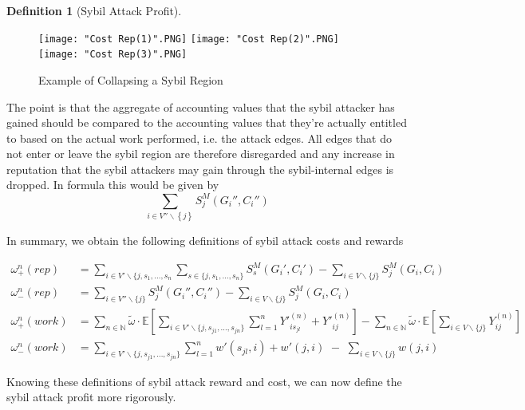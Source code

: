 \documentclass[11pt,a4paper]{article}
\theoremstyle{definition}
\newtheorem{definition}{Definition}[section]
\theoremstyle{theorem}
\theoremstyle{proposition}
\theoremstyle{corollary}
\theoremstyle{lemma}
\theoremstyle{example}
\theoremstyle{remark}
\begin{document}
\begin{definition}[Sybil Attack Profit]
\begin{figure}[H]
\begin{center}
\texttt{[image: "Cost Rep(1)".PNG]} 
\texttt{[image: "Cost Rep(2)".PNG]} 
\texttt{[image: "Cost Rep(3)".PNG]}
\caption{Example of Collapsing a Sybil Region}
\label{fig:Example of Collapsing a Sybil Region}
\end{center}
\end{figure}

\noindent{}The point is that the aggregate of accounting values that the sybil attacker has gained should be compared to the accounting values that they're actually entitled to based on the actual work performed, i.e. the attack edges. All edges that do not enter or leave the sybil region are therefore disregarded and any increase in reputation that the sybil attackers may gain through the sybil-internal edges is dropped. In formula this would be given by \vspace{1em}\\

\[
\sum\limits_{i\in{}V''\backslash\left\lbrace{}j\right\rbrace{}}S^M_j(G_i'',C_i'')
\]

\noindent{}In summary, we obtain the following definitions of sybil attack costs and rewards 

\begin{align*}
\omega_{+}^{n}(rep) &= \sum\limits_{i\in{}V'\backslash\lbrace{}j,s_1,\ldots,s_n}\sum\limits_{s\in\lbrace{}j,s_1,\ldots,s_n\rbrace}S^M_s(G_i',C_i') - \sum\limits_{i\in{}V\backslash\lbrace{}j\rbrace}S^M_j(G_i,C_i) \\
\omega_{-}^{n}(rep) &= \sum_{i\in{}V''\backslash\lbrace{}j\rbrace}S^M_j(G_i'',C_i'') - \sum\limits_{i\in{}V\backslash\lbrace{}j\rbrace}S_j^M(G_i,C_i) \\
\omega_{+}^{n}(work) &= \sum\limits_{n\in\mathbb{N}}\tilde{\omega}\cdot\mathbb{E}\left[\sum\limits_{i\in{}V'\backslash\lbrace{}j,s_{j1},\ldots,s_{jn}\rbrace}\sum\limits_{l=1}^{n}Y'^{(n)}_{is_{jl}} + Y'^{(n)}_{ij}\right] - \sum\limits_{n\in\mathbb{N}}\tilde{\omega}\cdot\mathbb{E}\left[\sum\limits_{i\in{}V\backslash\lbrace{}j\rbrace}Y^{(n)}_{ij}\right] \\
\omega_{-}^{n}(work) &= \sum\limits_{i\in{}V'\backslash\lbrace{}j,s_{j1},\ldots,s_{jn}\rbrace}\sum\limits_{l=1}^{n}w'(s_{jl},i) + w'(j,i) \,\, - \,\, \sum\limits_{i\in{}V\backslash\lbrace{}j\rbrace}w(j,i) 
\end{align*}

\noindent{}Knowing these definitions of sybil attack reward and cost, we can now define the sybil attack profit more rigorously. \vspace{1em}\\


\end{definition}
\end{document}
